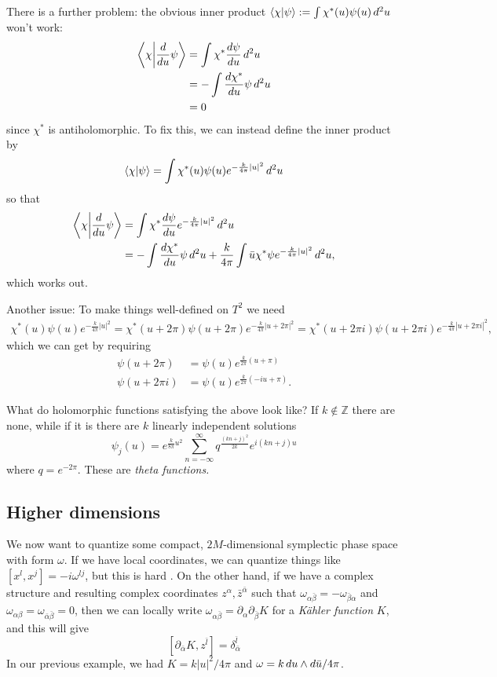 There is a further problem: the obvious inner product $\left \langle \chi \middle | \psi \right \rangle := \int \chi^*(u) \psi(u) \, d^2u$ won't work:
\begin{align*}
\left \langle \chi \middle | \frac{d}{du} \psi \right \rangle &= \int \chi^* \frac{d \psi}{d u} \, d^2 u\\
&= - \int \frac{d \chi^*}{d u} \psi \, d^2u\\
&= 0
\end{align*}
since $\chi^*$ is antiholomorphic.
To fix this, we can instead define the inner product by
\[
\left \langle \chi \middle | \psi \right \rangle = \int \chi^*(u) \psi(u) e^{- \frac{k}{4 \pi}|u|^2}\, d^2u
\]
so that
\begin{align*}
\left \langle \chi \middle | \frac{d}{du} \psi \right \rangle &= \int \chi^* \frac{d \psi}{du} e^{-\frac{k}{4 \pi}|u|^2} \, d^2u\\
&= - \int \frac{d \chi^*}{du} \psi \, d^2u + \frac{k}{4 \pi} \int \bar u \chi^* \psi e^{-\frac{k}{4 \pi} |u|^2} \, d^2 u,
\end{align*}
which works out.

Another issue: To make things well-defined on $T^2$ we need
\begin{align*}
\chi^*(u) \psi(u) e^{-\frac{k}{4 \pi}|u|^2} = \chi^*(u+ 2 \pi) \psi(u+ 2 \pi) e^{-\frac{k}{4 \pi}|u+ 2 \pi|^2} = \chi^*(u + 2 \pi i) \psi(u + 2 \pi i) e^{-\frac{k}{4 \pi}|u + 2 \pi i|^2},
\end{align*}
which we can get by requiring
\begin{align*}
\psi(u + 2 \pi) &= \psi(u) e^{\frac{k}{2 \pi} (u+ \pi)}\\
\psi(u + 2 \pi i) &= \psi(u) e^{\frac{k}{2 \pi} (-iu+ \pi)}.
\end{align*}

What do holomorphic functions satisfying the above look like?
If $k \not \in \mathbb Z$ there are none, while if it is there are $k$ linearly independent solutions
\[
\psi_j(u) = e^{\frac{k}{8 \pi} u^2} \sum_{n = - \infty}^\infty q^{\frac{(kn+j)^2}{2k}} e^{i(kn+j)u}
\]
where $q = e^{-2 \pi}$.
These are \emph{theta functions.}

\subsection*{Higher dimensions}
We now want to quantize some compact, $2M$-dimensional symplectic phase space with form $\omega$.
If we have local coordinates, we can quantize things like $[x^l, x^j] = - i \omega^{lj}$, but this is hard .
On the other hand, if we have a complex structure and resulting complex coordinates $z^\alpha, \bar z^{\bar \alpha}$ such that
$\omega_{\alpha \bar \beta} = - \omega_{\bar \beta \alpha}$ and $\omega_{\alpha \beta} = \omega_{\bar \alpha \bar \beta} = 0$, then we can locally write $\omega_{\alpha \bar \beta} = \partial_\alpha \partial_{\bar \beta} K$ for a \emph{K\"ahler function} $K$, and this will give
\[
[\partial_{\bar \alpha} K , z^{\bar l}] = \delta_{\bar \alpha}^{\bar l}
\]
In our previous example, we had $K = k |u|^2 /4 \pi$ and $\omega = k \, d u \wedge d \bar u /4 \pi$.

